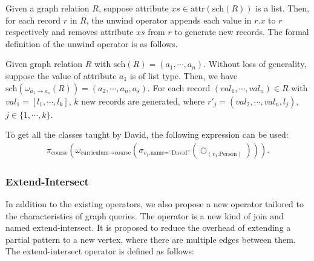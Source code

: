 Given a graph relation $R$, suppose attribute $xs \in \text{attr}(\text{sch}(R))$ is a list.
Then, for each record $r$ in $R$, the unwind operator appends each value in $r.x$ to $r$ respectively and removes attribute $xs$ from $r$ to generate new records.
The formal definition of the unwind operator is as follows.

\begin{definition}
    Given graph relation $R$ with $\text{sch}(R) = (a_1, \cdots, a_n)$.
    Without loss of generality, suppose the value of attribute $a_1$ is of list type.
    Then, we have $\text{sch}(\omega_{a_1 \rightarrow a_s}(R)) = (a_2, \cdots, a_n, a_s)$.
    For each record $(val_1, \cdots, val_n) \in R$ with $val_1 = [l_1, \cdots, l_k]$,  $k$ new records are generated, where $r'_j = (val_2, \cdots, val_n, l_j)$, $j \in \{1, \cdots, k\}$.
\end{definition}

\begin{example}
    To get all the classes taught by David, the following expression can be used:
    \begin{equation*}
        \begin{split}
            \pi_{\text{course}}(\omega_{\text{curriculum} \rightarrow \text{course}}(\sigma_{v_1\text{.name=``David''}}(\bigcirc_{(v_1\text{:Person})}))).
        \end{split}
    \end{equation*}
\end{example}


\subsubsection{Extend-Intersect}
In addition to the existing operators, we also propose a new operator tailored to the characteristics of graph queries.
The operator is a new kind of join and named extend-intersect.
It is proposed to reduce the overhead of extending a partial pattern to a new vertex, where there are multiple edges between them.
The extend-intersect operator is defined as follows:

